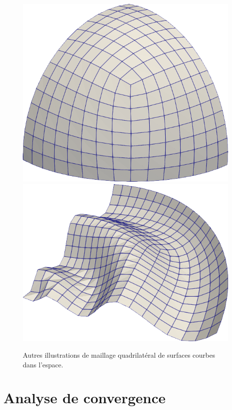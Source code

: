 \begin{figure}[!h]
\centering
\includegraphics[scale=0.35]{images/huit_quad.png}\hfill
\includegraphics[scale=0.4]{images/vagues.png}
\caption{Autres illustrations de maillage quadrilatéral de surfaces courbes dans l'espace.}
\label{another}
\end{figure}


\section{Analyse de convergence}

